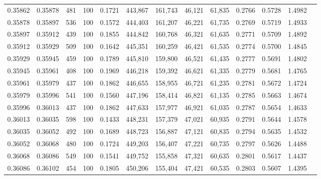 \begin{tabular}{rrrrrrrrrrrrr}
0.35862 & 0.35878 &   481 & 100 &                                     0.1721 & 443,867 & 161,743 &  46,121 &  61,835 & 0.2766 & 0.5728 & 1.4982 \\
0.35878 & 0.35897 &   536 & 100 &                                     0.1572 & 444,403 & 161,207 &  46,221 &  61,735 & 0.2769 & 0.5719 & 1.4933 \\
0.35897 & 0.35912 &   439 & 100 &                                     0.1855 & 444,842 & 160,768 &  46,321 &  61,635 & 0.2771 & 0.5709 & 1.4892 \\
0.35912 & 0.35929 &   509 & 100 &                                     0.1642 & 445,351 & 160,259 &  46,421 &  61,535 & 0.2774 & 0.5700 & 1.4845 \\
0.35929 & 0.35945 &   459 & 100 &                                     0.1789 & 445,810 & 159,800 &  46,521 &  61,435 & 0.2777 & 0.5691 & 1.4802 \\
0.35945 & 0.35961 &   408 & 100 &                                     0.1969 & 446,218 & 159,392 &  46,621 &  61,335 & 0.2779 & 0.5681 & 1.4765 \\
0.35961 & 0.35979 &   437 & 100 &                                     0.1862 & 446,655 & 158,955 &  46,721 &  61,235 & 0.2781 & 0.5672 & 1.4724 \\
0.35979 & 0.35996 &   541 & 100 &                                     0.1560 & 447,196 & 158,414 &  46,821 &  61,135 & 0.2785 & 0.5663 & 1.4674 \\
0.35996 & 0.36013 &   437 & 100 &                                     0.1862 & 447,633 & 157,977 &  46,921 &  61,035 & 0.2787 & 0.5654 & 1.4633 \\
0.36013 & 0.36035 &   598 & 100 &                                     0.1433 & 448,231 & 157,379 &  47,021 &  60,935 & 0.2791 & 0.5644 & 1.4578 \\
0.36035 & 0.36052 &   492 & 100 &                                     0.1689 & 448,723 & 156,887 &  47,121 &  60,835 & 0.2794 & 0.5635 & 1.4532 \\
0.36052 & 0.36068 &   480 & 100 &                                     0.1724 & 449,203 & 156,407 &  47,221 &  60,735 & 0.2797 & 0.5626 & 1.4488 \\
0.36068 & 0.36086 &   549 & 100 &                                     0.1541 & 449,752 & 155,858 &  47,321 &  60,635 & 0.2801 & 0.5617 & 1.4437 \\
0.36086 & 0.36102 &   454 & 100 &                                     0.1805 & 450,206 & 155,404 &  47,421 &  60,535 & 0.2803 & 0.5607 & 1.4395 \\

\end{tabular}
